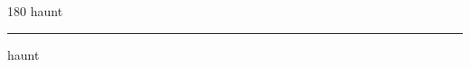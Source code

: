
\begin{frame}
\begin{center}
\begin{turn}{180}
{\fontsize{2.5cm}{1em}\selectfont haunt}
\end{turn}
\vspace{1em}\par  
\hrule
\vspace{1em}\par  
{\fontsize{2.5cm}{1em}\selectfont haunt}
\end{center}
\end{frame}
